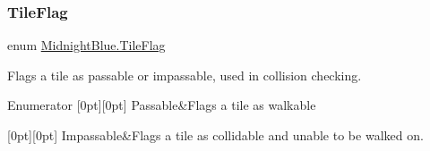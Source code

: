 \hypertarget{namespace_midnight_blue_ad3f455dc6bab1e76768d1a468ae3e33b}{}\label{namespace_midnight_blue_ad3f455dc6bab1e76768d1a468ae3e33b} 
\subsubsection{\texorpdfstring{Tile\+Flag}{TileFlag}}
{\footnotesize\ttfamily enum \hyperlink{namespace_midnight_blue_ad3f455dc6bab1e76768d1a468ae3e33b}{Midnight\+Blue.\+Tile\+Flag}\hspace{0.3cm}{\ttfamily [strong]}}



Flags a tile as passable or impassable, used in collision checking. 

\begin{DoxyEnumFields}{Enumerator}
[0pt][0pt]{}\hypertarget{namespace_midnight_blue_ad3f455dc6bab1e76768d1a468ae3e33ba01bb7f8bb1804fb74130d34c8c977a99}{}\label{namespace_midnight_blue_ad3f455dc6bab1e76768d1a468ae3e33ba01bb7f8bb1804fb74130d34c8c977a99} 
Passable&Flags a tile as walkable \\
\hline

[0pt][0pt]{}\hypertarget{namespace_midnight_blue_ad3f455dc6bab1e76768d1a468ae3e33ba02518d4f54df131d84d3b77bcb2bdce4}{}\label{namespace_midnight_blue_ad3f455dc6bab1e76768d1a468ae3e33ba02518d4f54df131d84d3b77bcb2bdce4} 
Impassable&Flags a tile as collidable and unable to be walked on. \\
\hline

\end{DoxyEnumFields}

